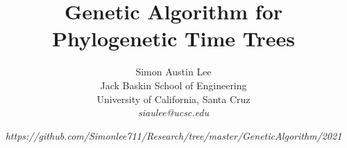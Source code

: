 \title{Genetic Algorithm for Phylogenetic Time Trees}

\author{ 
Simon Austin Lee\\
Jack Baskin School of Engineering \\
University of California, Santa Cruz\\
\emph{siaulee@ucsc.edu}
}\date{\small\emph{https://github.com/Simonlee711/Research/tree/master/GeneticAlgorithm/2021}}
\maketitle 
